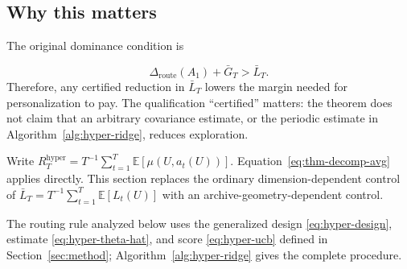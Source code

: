 \documentclass{article} %
\providecommand{\Droute}{\Delta_{\mathrm{route}}}
\begin{document}
\subsection{Why this matters}

The original dominance condition is

\begin{equation}
\Droute(A_1) + \bar{G}_T > \bar{L}_T .
\end{equation}
Therefore, any certified reduction in $\bar L_T$ lowers the margin needed for
personalization to pay. The qualification ``certified'' matters: the theorem
does not claim that an arbitrary covariance estimate, or the periodic estimate
in Algorithm~\ref{alg:hyper-ridge}, reduces exploration.




Write
\(R_T^{\mathrm{hyper}}
=T^{-1}\sum_{t=1}^{T}\mathbb{E}[\mu(U,a_t(U))]\).
Equation~\eqref{eq:thm-decomp-avg} applies directly. This section replaces the
ordinary dimension-dependent control of
\(\bar L_T=T^{-1}\sum_{t=1}^{T}\mathbb{E}[L_t(U)]\)
with an archive-geometry-dependent control.

The routing rule analyzed below uses the generalized design
\eqref{eq:hyper-design}, estimate \eqref{eq:hyper-theta-hat}, and score
\eqref{eq:hyper-ucb} defined in Section~\ref{sec:method}; Algorithm~\ref{alg:hyper-ridge}
gives the complete procedure.
\end{document}
